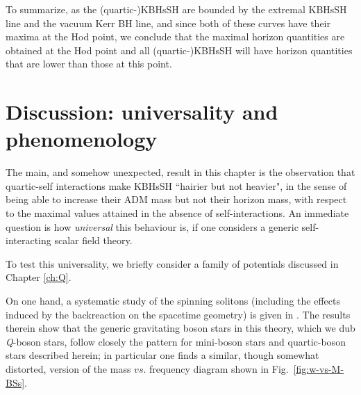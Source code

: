 To summarize, as the (quartic-)KBHsSH are bounded by the extremal KBHsSH line and the vacuum Kerr BH line,  and since both of these curves have their maxima at the Hod point, 
we conclude that the maximal horizon quantities are obtained at the Hod point and all 
(quartic-)KBHsSH will have horizon quantities that are
lower than those at this point.



\section{Discussion: universality and phenomenology}
\label{sec_V}
The main, and somehow unexpected, result in this chapter is the observation that quartic-self interactions make KBHsSH ``hairier but not heavier", in the sense of being able to increase their ADM mass but not their horizon mass, with respect to the maximal values attained in the absence of self-interactions. An immediate question is how \textit{universal} this behaviour is, if one considers a generic self-interacting scalar field theory.

To test this universality, we briefly consider a family of potentials discussed in Chapter \ref{ch:Q}.

On one hand, a systematic study of the spinning solitons 
(including the effects induced by the backreaction on the spacetime geometry) 
is given in \cite{Kleihaus:2005me}.
The results therein show that the
 generic gravitating boson stars in this theory, which we dub \textit{Q}-boson stars, follow closely the pattern for mini-boson stars and quartic-boson stars described herein; in particular 
one finds a similar, though somewhat distorted, version of the mass $vs.$ frequency diagram shown in Fig.~\ref{fig:w-vs-M-BSs}.

